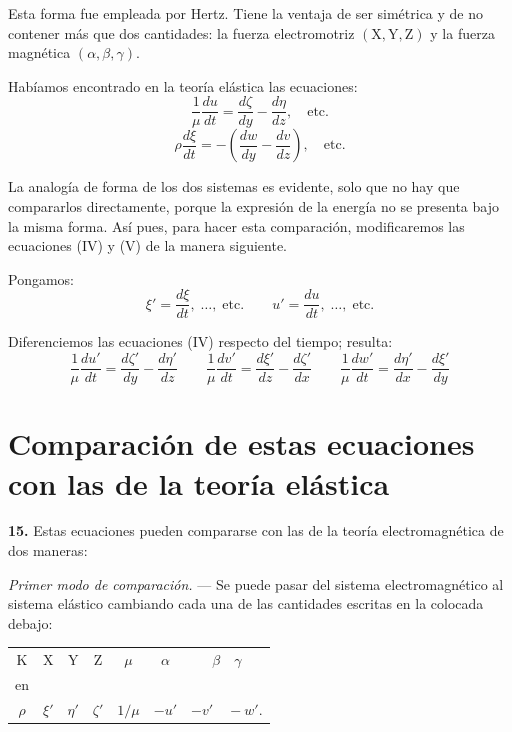 Esta forma fue empleada por Hertz. Tiene la ventaja de ser simétrica y de
no contener más que dos cantidades: la fuerza electromotriz
$(\mathrm{X},\mathrm{Y},\mathrm{Z})$ y la fuerza magnética
$(\alpha,\beta,\gamma)$.

Habíamos encontrado en la teoría elástica las ecuaciones:
\begin{equation}
\frac{1}{\mu}\frac{du}{dt}=\frac{d\zeta}{dy}-\frac{d\eta}{dz},\quad\text{etc.}
\tag{IV}
\end{equation}
\begin{equation}
\rho\frac{d\xi}{dt}=-\left(\frac{dw}{dy}-\frac{dv}{dz}\right),\quad\text{etc.}
\tag{V}
\end{equation}

La analogía de forma de los dos sistemas es evidente, solo que no hay que
compararlos directamente, porque la expresión de la energía no se
presenta bajo la misma forma. Así pues, para hacer esta comparación,
modificaremos las ecuaciones (IV) y (V) de la manera siguiente.

Pongamos:
\[
\xi'=\frac{d\xi}{dt},\;\ldots,\;\text{etc.}\qquad u'=\frac{du}{dt},\;\ldots,\;\text{etc.}
\]

Diferenciemos las ecuaciones (IV) respecto del tiempo; resulta:
\begin{equation}
\frac{1}{\mu}\frac{du'}{dt}=\frac{d\zeta'}{dy}-\frac{d\eta'}{dz}\qquad
\frac{1}{\mu}\frac{dv'}{dt}=\frac{d\xi'}{dz}-\frac{d\zeta'}{dx}\qquad
\frac{1}{\mu}\frac{dw'}{dt}=\frac{d\eta'}{dx}-\frac{d\xi'}{dy}
\tag{8}
\end{equation}

\section{Comparación de estas ecuaciones con las de la teoría elástica}

\noindent\textbf{15.} Estas ecuaciones pueden compararse con las de la
teoría electromagnética de dos maneras:

\emph{Primer modo de comparación.} — Se puede pasar del sistema
electromagnético al sistema elástico cambiando cada una de las cantidades
escritas en la colocada debajo:
\begin{center}
\begin{tabular}{ccccccc}
$\mathrm{K}$ & $\mathrm{X}$ & $\mathrm{Y}$ & $\mathrm{Z}$ & $\mu$ & $\alpha$ & $\beta\quad\gamma$\\
en & & & & & & \\
$\rho$ & $\xi'$ & $\eta'$ & $\zeta'$ & $1/\mu$ & $-u'$ & $-v'\quad -w'$.
\end{tabular}
\end{center}

